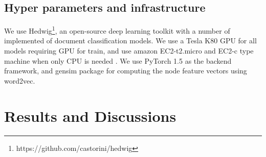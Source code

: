 \documentclass[letterpaper]{article}
\begin{document}
\subsection{Hyper parameters and infrastructure}
We use Hedwig\footnote{https://github.com/castorini/hedwig},
an open-source deep learning
toolkit with a number of implemented of document classification models. 
We use a Tesla K80 GPU for all models requiring GPU for train, and use amazon EC2-t2.micro and EC2-c type machine when only CPU is needed . We use PyTorch 1.5 as the backend framework, and gensim \cite{gensim} package for computing the node feature vectors using word2vec.\\







%
 \section{Results and Discussions}
\end{document}
